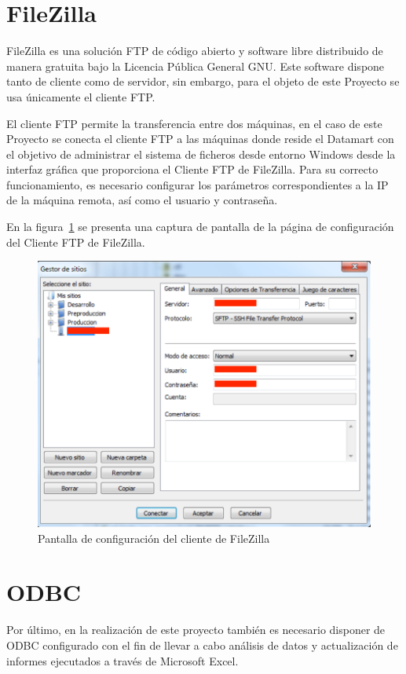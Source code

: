 \documentclass[a4paper, 12pt]{book}
\begin{document}
\section{FileZilla}
\label{sec:FileZilla}
FileZilla es una solución FTP de código abierto y software libre distribuido de manera gratuita bajo la Licencia Pública General GNU. Este software dispone tanto de cliente como de servidor, sin embargo, para el objeto de este Proyecto se usa únicamente el cliente FTP.

El cliente FTP permite la transferencia entre dos máquinas, en el caso de este Proyecto se conecta el cliente FTP a las máquinas donde reside el Datamart con el objetivo de administrar el sistema de ficheros desde entorno Windows desde la interfaz gráfica que proporciona el Cliente FTP de FileZilla. Para su correcto funcionamiento, es necesario configurar los parámetros correspondientes a la IP de la máquina remota, así como el usuario y contraseña.

En la figura~\ref{fig:FileZilla_Config} se presenta una captura de pantalla de la página de configuración del Cliente FTP de FileZilla.

\begin{figure}
   \centering
   \includegraphics[width=12cm, keepaspectratio]{img/filezillaconfig}
   \caption{Pantalla de configuración del cliente de FileZilla}
   \label{fig:FileZilla_Config}
\end{figure}

\section{ODBC}
\label{sec:ODBC}
Por último, en la realización de este proyecto también es necesario disponer de ODBC configurado con el fin de llevar a cabo análisis de datos y actualización de informes ejecutados a través de Microsoft Excel.
\end{document}
